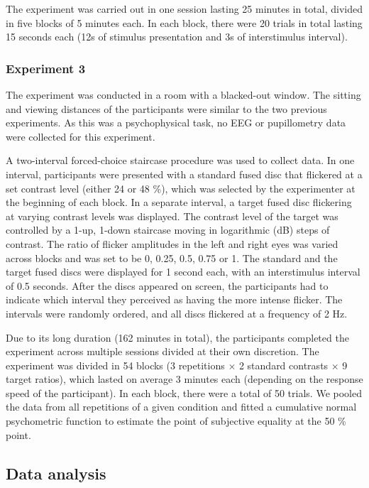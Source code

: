 \documentclass[
]{article}
\begin{document}
The experiment was carried out in one session lasting 25 minutes in total, divided in five blocks of 5 minutes each. In each block, there were 20 trials in total lasting 15 seconds each (12s of stimulus presentation and 3s of interstimulus interval).

\hypertarget{experiment-3}{%
\subsubsection{Experiment 3}\label{experiment-3}}

The experiment was conducted in a room with a blacked-out window. The sitting and viewing distances of the participants were similar to the two previous experiments. As this was a psychophysical task, no EEG or pupillometry data were collected for this experiment.

A two-interval forced-choice staircase procedure was used to collect data. In one interval, participants were presented with a standard fused disc that flickered at a set contrast level (either 24 or 48 \%), which was selected by the experimenter at the beginning of each block. In a separate interval, a target fused disc flickering at varying contrast levels was displayed. The contrast level of the target was controlled by a 1-up, 1-down staircase moving in logarithmic (dB) steps of contrast. The ratio of flicker amplitudes in the left and right eyes was varied across blocks and was set to be 0, 0.25, 0.5, 0.75 or 1. The standard and the target fused discs were displayed for 1 second each, with an interstimulus interval of 0.5 seconds. After the discs appeared on screen, the participants had to indicate which interval they perceived as having the more intense flicker. The intervals were randomly ordered, and all discs flickered at a frequency of 2 Hz.

Due to its long duration (162 minutes in total), the participants completed the experiment across multiple sessions divided at their own discretion. The experiment was divided in 54 blocks (3 repetitions \(\times\) 2 standard contrasts \(\times\) 9 target ratios), which lasted on average 3 minutes each (depending on the response speed of the participant). In each block, there were a total of 50 trials. We pooled the data from all repetitions of a given condition and fitted a cumulative normal psychometric function to estimate the point of subjective equality at the 50 \% point.

\hypertarget{data-analysis}{%
\subsection{Data analysis}\label{data-analysis}}
\end{document}
